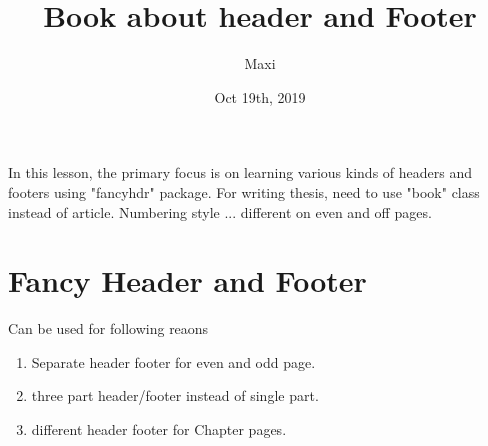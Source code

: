 \documentclass{book}
\title{Book about header and Footer}
\author{Maxi}
\date{Oct 19th, 2019}
\begin{document}
	\maketitle
	In this lesson, the primary focus is on learning various kinds of headers and footers using "fancyhdr" package. For writing thesis, need to use "book" class instead of article. Numbering style ... different on even and off pages.
	
	\chapter{Fancy Header and Footer}
		Can be used for following reaons
		\begin{enumerate}
			\item Separate header footer for even and odd page.
			\item three part header/footer instead of single part.
			\item different header footer for Chapter pages.
		\end{enumerate}
	\blindtext[30]
	


	
	
\end{document}
